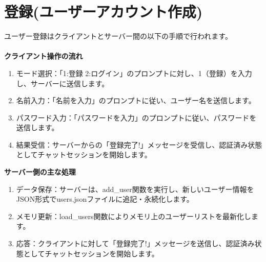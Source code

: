 \documentclass{article}
\begin{document}
\section{登録(ユーザーアカウント作成)}
ユーザー登録はクライアントとサーバー間の以下の手順で行われます。\\\\
\textbf{クライアント操作の流れ}
\begin{enumerate}
    \item モード選択：「1:登録 2:ログイン」のプロンプトに対し、1（登録）を入力し、サーバーに送信します。
    \item 名前入力：「名前を入力」のプロンプトに従い、ユーザー名を送信します。
    \item パスワード入力：「パスワードを入力」のプロンプトに従い、パスワードを送信します。
    \item 結果受信：サーバーからの「登録完了!」メッセージを受信し、認証済み状態としてチャットセッションを開始します。
\end{enumerate}
\textbf{サーバー側の主な処理}
\begin{enumerate}
    \item データ保存：サーバーは、add\_user関数を実行し、新しいユーザー情報をJSON形式でusers.jsonファイルに追記・永続化します。
    \item メモリ更新：load\_users関数によりメモリ上のユーザーリストを最新化します。
    \item 応答：クライアントに対して「登録完了!」メッセージを送信し、認証済み状態としてチャットセッションを開始します。
\end{enumerate}
\end{document}
